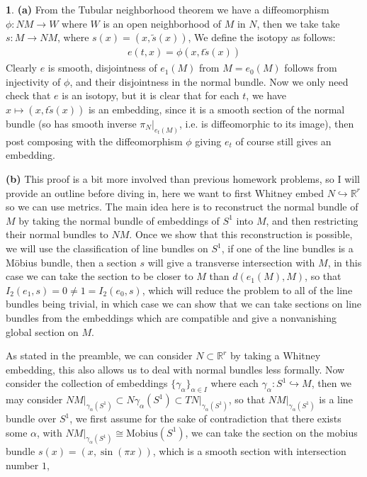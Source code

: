 \documentclass[10.5pt]{article}
\theoremstyle{definition}
\newtheorem{pb}{}
\newcommand{\set}[1]{\{#1\}}
\begin{document}
    \begin{pb}
        \textbf{(a)} From the Tubular neighborhood theorem we have a diffeomorphism \(\phi: NM \to W\) where \(W\) is an open neighborhood of \(M\) in \(N\), then we take take \(s: M \to NM\), where \(s(x) = (x,\tilde{s}(x))\), We define the isotopy as follows:
        \begin{align*}
            e(t,x) = \phi(x,t\tilde{s}(x))
        \end{align*}
        Clearly \(e\) is smooth, disjointness of \(e_1(M)\) from \(M = e_0(M)\) follows from injectivity of \(\phi\), and their disjointness in the normal bundle. Now we only need check that \(e\) is an isotopy, but it is clear that for each \(t\), we have \(x \mapsto (x,t\tilde{s}(x))\) is an embedding, since it is a smooth section of the normal bundle (so has smooth inverse \(\pi_N\vert_{e_t(M)}\), i.e. is diffeomorphic to its image), then post composing with the diffeomorphism \(\phi\) giving \(e_t\) of course still gives an embedding.

        \textbf{(b)} This proof is a bit more involved than previous homework problems, so I will provide an outline before diving in, here we want to first Whitney embed \(N \hookrightarrow \mathbb{R}^r\) so we can use metrics. The main idea here is to reconstruct the normal bundle of \(M\) by taking the normal bundle of embeddings of \(S^1\) into \(M\), and then restricting their normal bundles to \(NM\). Once we show that this reconstruction is possible, we will use the classification of line bundles on \(S^1\), if one of the line bundles is a M\"obius bundle, then a section \(s\) will give a transverse intersection with \(M\), in this case we can take the section to be closer to \(M\) than \(d(e_1(M),M)\), so that \(I_2(e_1,s) = 0 \neq 1 = I_2(e_0,s)\), which will reduce the problem to all of the line bundles being trivial, in which case we can show that we can take sections on line bundles from the embeddings which are compatible and give a nonvanishing global section on \(M\).

        As stated in the preamble, we can consider \(N \subset \mathbb{R}^r\) by taking a Whitney embedding, this also allows us to deal with normal bundles less formally. Now consider the collection of embeddings \(\set{\gamma_\alpha}_{\alpha \in I}\) where each \(\gamma_\alpha: S^1 \hookrightarrow M\), then we may consider \(NM\vert_{\gamma_\alpha(S^1)} \subset N\gamma_\alpha(S^1) \subset TN\vert_{\gamma_{\alpha}(S^1)}\), so that \(NM\vert_{\gamma_\alpha(S^1)}\) is a line bundle over \(S^1\), we first assume for the sake of contradiction that there exists some \(\alpha\), with \(NM\vert_{\gamma_\alpha(S^1)} \cong \text{Mobius}(S^1)\), we can take the section on the mobius bundle \(s(x) = (x,\sin(\pi x))\), which is a smooth section with intersection number \(1\),
    \end{pb}
\end{document}
